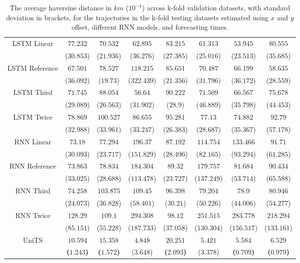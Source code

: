 \begin{table}[!ht]
{\begin{tabular}{|c|c|c|c|c|c|c|c|}
			\multirow{2}{*}{LSTM Linear} & $77.232$ & $70.532$ & $62.895$ & $83.215$ & $61.313$ & $53.945$ & $80.555$ \\
			 & ($30.853$) & ($21.936$) & ($36.276$) & ($27.385$) & ($25.016$) & ($23.513$) & ($35.685$) \\ \hline
			\multirow{2}{*}{LSTM Reference} & $67.501$ & $78.527$ & $118.215$ & $85.651$ & $70.487$ & $66.199$ & $58.635$ \\
			 & ($36.092$) & ($19.73$) & ($322.439$) & ($21.356$) & ($31.796$) & ($36.172$) & ($28.559$) \\ \hline
			\multirow{2}{*}{LSTM Third} & $71.745$ & $88.054$ & $56.64$ & $90.222$ & $71.509$ & $66.567$ & $75.678$ \\
			 & ($29.089$) & ($26.563$) & ($31.902$) & ($28.9$) & ($46.889$) & ($35.798$) & ($44.453$) \\ \hline
			\multirow{2}{*}{LSTM Twice} & $78.869$ & $100.527$ & $86.655$ & $95.281$ & $77.13$ & $74.882$ & $92.79$ \\
			 & ($32.988$) & ($33.961$) & ($33.247$) & ($26.383$) & ($28.687$) & ($35.367$) & ($57.178$) \\ \hline
			\multirow{2}{*}{RNN Linear} & $73.18$ & $77.294$ & $196.37$ & $87.192$ & $114.754$ & $133.466$ & $91.71$ \\
			 & ($30.093$) & ($23.717$) & ($151.829$) & ($28.496$) & ($82.165$) & ($93.294$) & ($61.285$) \\ \hline
			\multirow{2}{*}{RNN Reference} & $73.863$ & $78.834$ & $184.304$ & $89.32$ & $179.757$ & $81.684$ & $90.434$ \\
			 & ($33.025$) & ($28.688$) & ($113.478$) & ($23.727$) & ($137.249$) & ($53.714$) & ($65.588$) \\ \hline
			\multirow{2}{*}{RNN Third} & $74.258$ & $103.875$ & $109.45$ & $96.398$ & $79.204$ & $78.9$ & $80.946$ \\
			 & ($24.073$) & ($36.828$) & ($58.401$) & ($30.21$) & ($50.226$) & ($44.006$) & ($54.277$) \\ \hline
			\multirow{2}{*}{RNN Twice} & $128.29$ & $109.1$ & $294.308$ & $98.12$ & $251.515$ & $283.778$ & $218.294$ \\
			 & ($85.151$) & ($55.228$) & ($187.733$) & ($37.058$) & ($130.304$) & ($156.517$) & ($133.161$) \\ \hline
			\multirow{2}{*}{UniTS} & $\mathbf{10.594}$ & $\mathbf{15.358}$ & $4.848$ & $\mathbf{20.251}$ & $5.421$ & $\mathbf{5.584}$ & $\mathbf{6.529}$ \\
			 & \textbf{(}$\mathbf{1.243}$\textbf{)} & \textbf{(}$\mathbf{1.572}$\textbf{)} & ($3.648$) & \textbf{(}$\mathbf{2.093}$\textbf{)} & ($3.378$) & \textbf{(}$\mathbf{0.709}$\textbf{)} & \textbf{(}$\mathbf{0.979}$\textbf{)} \\ \hline
		\end{tabular}
	}
	\caption{The average haversine distance in $km$ ($10^{-1}$) across k-fold validation datasets, with standard deviation in brackets, for the trajectories in the k-fold testing datasets estimated using $x$ and $y$ offset, different RNN models, and forecasting times.}
	\label{tab:all_no_abs_haversine}
\end{table}